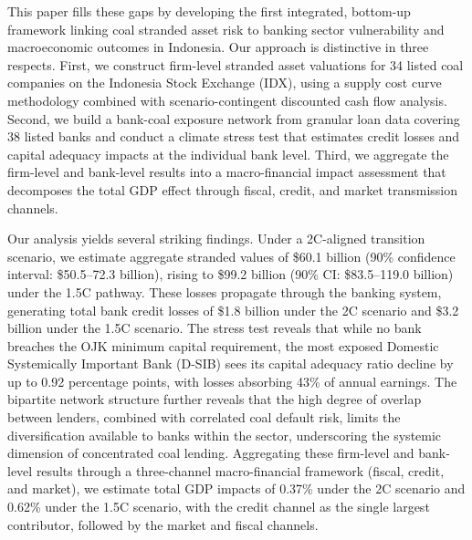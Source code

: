 This paper fills these gaps by developing the first integrated, bottom-up framework linking coal stranded asset risk to banking sector vulnerability and macroeconomic outcomes in Indonesia. Our approach is distinctive in three respects. First, we construct firm-level stranded asset valuations for 34 listed coal companies on the Indonesia Stock Exchange (IDX), using a supply cost curve methodology combined with scenario-contingent discounted cash flow analysis. Second, we build a bank-coal exposure network from granular loan data covering 38 listed banks and conduct a climate stress test that estimates credit losses and capital adequacy impacts at the individual bank level. Third, we aggregate the firm-level and bank-level results into a macro-financial impact assessment that decomposes the total GDP effect through fiscal, credit, and market transmission channels.

Our analysis yields several striking findings. Under a 2\textdegree C-aligned transition scenario, we estimate aggregate stranded values of \$60.1 billion (90\% confidence interval: \$50.5--72.3 billion), rising to \$99.2 billion (90\% CI: \$83.5--119.0 billion) under the 1.5\textdegree C pathway. These losses propagate through the banking system, generating total bank credit losses of \$1.8 billion under the 2\textdegree C scenario and \$3.2 billion under the 1.5\textdegree C scenario. The stress test reveals that while no bank breaches the OJK minimum capital requirement, the most exposed Domestic Systemically Important Bank (D-SIB) sees its capital adequacy ratio decline by up to 0.92 percentage points, with losses absorbing 43\% of annual earnings. The bipartite network structure further reveals that the high degree of overlap between lenders, combined with correlated coal default risk, limits the diversification available to banks within the sector, underscoring the systemic dimension of concentrated coal lending. Aggregating these firm-level and bank-level results through a three-channel macro-financial framework (fiscal, credit, and market), we estimate total GDP impacts of 0.37\% under the 2\textdegree C scenario and 0.62\% under the 1.5\textdegree C scenario, with the credit channel as the single largest contributor, followed by the market and fiscal channels.

